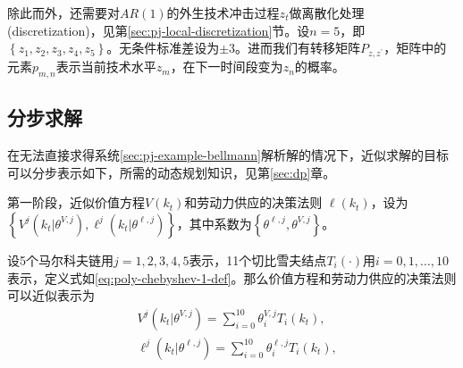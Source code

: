 除此而外，还需要对$AR(1)$的外生技术冲击过程$z_{t}$做离散化处理(discretization)，见第\ref{sec:pj-local-discretization}节。设$n=5$，即$\left\{ z_{1},z_{2},z_{3},z_{4},z_{5} \right\}$。无条件标准差设为$\pm 3$。进而我们有转移矩阵$P_{z,z^{'}}$，矩阵中的元素$p_{m,n}$表示当前技术水平$z_{m}$，在下一时间段变为$z_{n}$的概率。

\subsection{分步求解}
\label{sec:pj-example-steps}
在无法直接求得系统\eqref{sec:pj-example-bellmann}解析解的情况下，近似求解的目标可以分步表示如下，所需的动态规划知识，见第\ref{sec:dp}章。

第一阶段，近似价值方程$V \left( k_{t} \right)$和劳动力供应的决策法则
$\ell \left( k_{t} \right)$，设为$\left\{
V^{j} \left( k_{t} | \theta^{V,j} \right),
\ell^{j}\left(k_{t} | \theta^{\ell,j} \right)
\right\}$，其中系数为$\left\{ \theta^{\ell,j}, \theta^{V,j} \right\}$。

设5个马尔科夫链用$j=1,2,3,4,5$表示，11个切比雪夫结点$T_{i} \left( \cdot \right)$用$i=0,1,\ldots,10$表示，定义式如\eqref{eq:poly-chebyshev-1-def}。那么价值方程和劳动力供应的决策法则可以近似表示为
\begin{align}
  \label{eq:pj-exmaple-teps-value}
  & V^{j} \left( k_{t} | \theta^{V,j} \right) = \sum_{i=0}^{10} \theta_{i}^{V,j}
  T_{i} \left( k _{t} \right), \\
  \label{eq:pj-exmaple-teps-labor}
  & \ell^{j}\left(k_{t} | \theta^{\ell,j} \right) =
  \sum_{i=0}^{10} \theta_{i}^{\ell, j} T_{i} \left( k_{t} \right),
\end{align}


